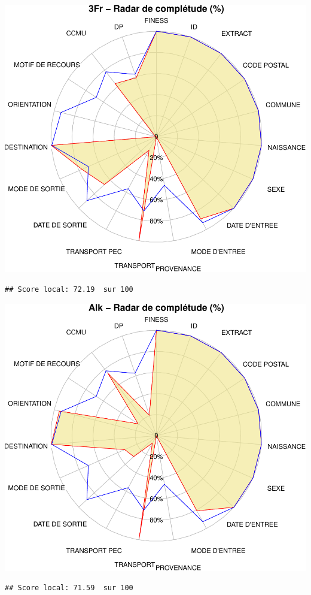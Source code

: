 \documentclass[]{article}
\begin{document}
\includegraphics{completude_files/figure-latex/finess-7.pdf}

\begin{verbatim}
## Score local: 72.19  sur 100
\end{verbatim}

\includegraphics{completude_files/figure-latex/finess-8.pdf}

\begin{verbatim}
## Score local: 71.59  sur 100
\end{verbatim}
\end{document}
